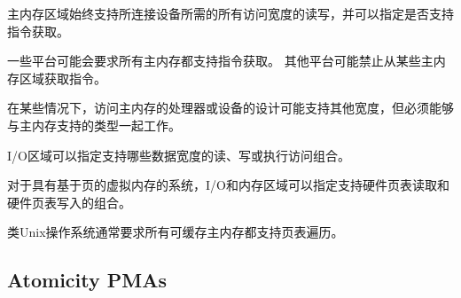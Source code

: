 {\iffalse
Main memory regions always support read and write of all
access widths required by the attached devices, and can
specify whether instruction fetch is supported.
\fi
主内存区域始终支持所连接设备所需的所有访问宽度的读写，并可以指定是否支持指令获取。

\iffalse
\begin{commentary}
Some platforms might mandate that all of main memory support instruction
fetch.
Other platforms might prohibit instruction fetch from some main memory
regions.
\end{commentary}
\fi
\begin{commentary}
一些平台可能会要求所有主内存都支持指令获取。
其他平台可能禁止从某些主内存区域获取指令。
\end{commentary}

\iffalse
\begin{commentary}
In some cases, the design of a processor or device accessing main
memory might support other widths, but must be able to function with
the types supported by the main memory.
\end{commentary}
\fi
\begin{commentary}
在某些情况下，访问主内存的处理器或设备的设计可能支持其他宽度，但必须能够与主内存支持的类型一起工作。
\end{commentary}

\iffalse
I/O regions can specify which combinations of read, write, or execute
accesses to which data widths are supported.

For systems with page-based virtual memory, I/O and memory regions can
specify which combinations of hardware page-table reads and hardware
page-table writes are supported.
\fi
I/O区域可以指定支持哪些数据宽度的读、写或执行访问组合。

对于具有基于页的虚拟内存的系统，I/O和内存区域可以指定支持硬件页表读取和硬件页表写入的组合。

\iffalse
\begin{commentary}
Unix-like operating systems generally require that all of cacheable main
memory supports page-table walks.
\end{commentary}
\fi
\begin{commentary}
类Unix操作系统通常要求所有可缓存主内存都支持页表遍历。
\end{commentary}

\subsection{Atomicity PMAs}

}
